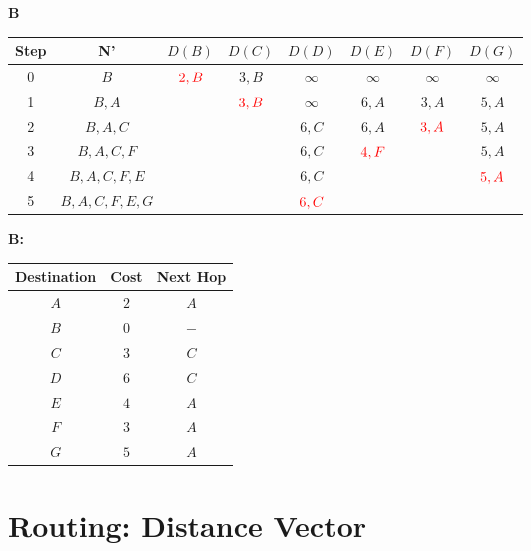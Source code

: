 \documentclass[10pt]{article}
\begin{document}
			\begin{center}
				\textbf{B}
				\begin{tabular}{||c c c c c c c c||} 
					\hline
					Step & N' & $D(B)$ & $D(C)$ & $D(D)$ & $D(E)$ & $D(F)$ & $D(G)$ \\[0.5ex] 
					\hline\hline
					0 & $B$ & $\color{red} 2,B$ & $3,B$ & $\infty$ & $\infty$ &$\infty$ & $\infty$ \\
					\hline
					1 & $B,A$ & & $\color{red} 3,B$ & $\infty$ & $6,A$ & $3,A$ & $5,A$ \\
					\hline
					2 & $B,A,C$ & & & $6,C$ & $6,A$ & $\color{red} 3,A$ & $5,A$ \\
					\hline
					3 & $B,A,C,F$ & & & $6,C$ & $\color{red} 4,F$ & & $5,A$ \\
					\hline
					4 & $B,A,C,F,E$ & & & $6,C$ & & & $\color{red} 5,A$ \\
					\hline
					5 & $B,A,C,F,E,G$ & & & $\color{red} 6,C$ & & & \\[0.5ex] 
					\hline
				\end{tabular}
			\end{center}
			\begin{center}
				\textbf{B:}
				\begin{tabular}{||c || c || c||}
					\hline
					Destination & Cost & Next Hop \\[0.5ex] 
					\hline\hline
					$A$ & $2$ & $A$ \\
					$B$ & $0$ & $-$ \\
					$C$ & $3$ & $C$ \\
					$D$ & $6$ & $C$ \\
					$E$ & $4$ & $A$ \\
					$F$ & $3$ & $A$ \\
					$G$ & $5$ & $A$ \\[0.5ex] 
					\hline
				\end{tabular}
			\end{center}	

		\newpage

	\section{Routing: Distance Vector}
\end{document}
